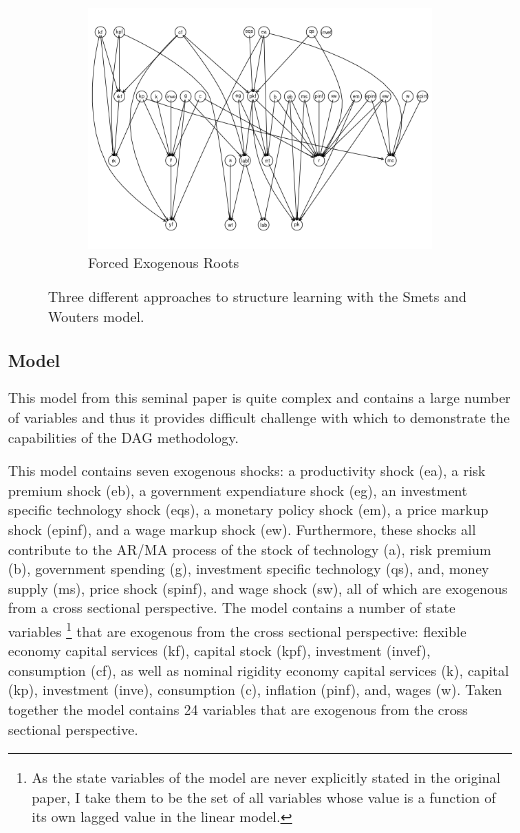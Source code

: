 \documentclass{article}
\begin{document}
\begin{figure}
\begin{subfigure}{0.3\textwidth}
      \includegraphics[width=\linewidth]{images/sw_bl.png}
      \caption{Forced Exogenous Roots}
      \label{bl}
    \end{subfigure}
  
    \caption{Three different approaches to structure learning with the Smets and Wouters model.}
    \label{dag9}
  \end{figure}

\subsubsection{Model}

This model from this seminal paper is quite complex and contains a large number of variables and thus it provides difficult challenge with which to demonstrate the capabilities of the DAG methodology. 

This model contains seven exogenous shocks: a productivity shock (ea), a risk premium shock (eb), a government expendiature shock (eg), an investment specific technology shock (eqs), a monetary policy shock (em), a price markup shock (epinf), and a wage markup shock (ew). Furthermore, these shocks all contribute to the AR/MA process of the stock of technology (a), risk premium (b), government spending (g), investment specific technology (qs), and, money supply (ms), price shock (spinf), and wage shock (sw), all of which are exogenous from a cross sectional perspective. The model contains a number of state variables \footnote{As the state variables of the model are never explicitly stated in the original paper, I take them to be the set of all variables whose value is a function of its own lagged value in the linear model.} that are exogenous from the cross sectional perspective: flexible economy capital services (kf), capital stock (kpf), investment (invef), consumption (cf), as well as nominal rigidity economy capital services (k), capital (kp), investment (inve), consumption (c), inflation (pinf), and, wages (w). Taken together the model contains 24 variables that are exogenous from the cross sectional perspective.
\end{document}

